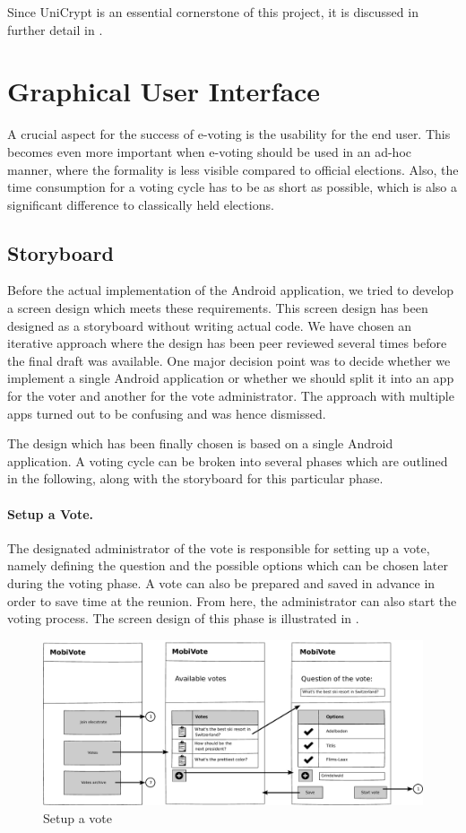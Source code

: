 \documentclass[numbers=noenddot, abstract=on, a4paper, headsepline,
footsepline, oneside, draft=off]{scrreprt}
\begin{document}
Since UniCrypt is an essential cornerstone of this project, it is discussed in
further detail in .

\section{Graphical User Interface}
\label{sec:gui}
A crucial aspect for the success of e-voting is the usability for the end user.
This becomes even more important when e-voting should be used in an ad-hoc
manner, where the formality is less visible compared to official elections.
Also, the time consumption for a voting cycle has to be as short as possible,
which is also a significant difference to classically held elections.

\subsection{Storyboard}
Before the actual implementation of the Android application, we tried to develop
a screen design which meets these requirements. This screen design has been
designed as a storyboard without writing actual code. We have chosen an
iterative approach where the design has been peer reviewed several times before
the final draft was available. One major decision point was to decide whether we
implement a single Android application or whether we should split it into an app
for the voter and another for the vote administrator. The approach with multiple apps
turned out to be confusing and was hence dismissed.

The design which has been finally chosen is based on a single Android
application. A voting cycle can be broken into several phases which are outlined
in the following, along with the storyboard for this particular phase.

\paragraph{Setup a Vote.}
The designated administrator of the vote is responsible for setting up a vote,
namely defining the question and the possible options which can be chosen later
during the voting phase. A vote can also be prepared and saved in advance in
order to save time at the reunion. From here, the administrator can also
start the voting process. The screen design of this phase is illustrated in
.

\begin{figure}[htb]
	\centering
	\includegraphics[height=.3\textheight]{img/storyboard/vote_setup}
	\caption{Setup a vote}
	\label{fig:vote_setup}
\end{figure}
\end{document}
